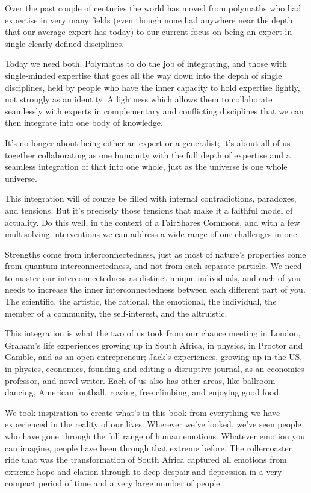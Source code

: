Over the past couple of centuries the world has moved from polymaths who had expertise in very many fields (even though none had anywhere near the depth that our average expert has today) to our current focus on being an expert in single clearly defined disciplines.


Today we need both. Polymaths  to do the job of integrating, and those with single-minded expertise that goes all the way down into the depth of single disciplines, held by people who have the inner capacity to hold expertise lightly, not strongly as an identity. A lightness which allows them to collaborate seamlessly with experts in complementary and conflicting disciplines that we can then integrate into one body of knowledge.


It's no longer about being either an expert or a generalist; it's about all of us together collaborating as one humanity with the full depth of expertise and a seamless integration of that into one whole, just as the universe is one whole universe.


This integration will of course be filled with internal contradictions, paradoxes, and tensions. But it's precisely those tensions that make it a faithful model of actuality. Do this well, in the context of a FairShares Commons,  and with a few multisolving interventions\cite{sawin-multisolving} we can address a wide range of our challenges in one.


Strengths come from interconnectedness, just as most of nature’s properties come from quantum interconnectedness, and not from each separate particle. We need to master our interconnectedness as distinct unique individuals, and each of you needs to increase the inner interconnectedness between each different part of you. The scientific, the artistic, the rational, the emotional, the individual, the member of a community, the self-interest, and the altruistic.


This integration is what the two of us took from our chance meeting in London, Graham’s life experiences growing up in South Africa, in physics, in Proctor and Gamble, and as an open entrepreneur; Jack's experiences, growing up in the US, in physics, economics, founding and editing a disruptive journal, as an economics professor, and novel writer. Each of us also has other areas, like ballroom dancing, American football, rowing, free climbing, and enjoying good food.   


We took inspiration to create what's in this book from everything we have experienced in the reality of our lives. Wherever we've looked, we've seen people who have gone through the full range of human emotions. Whatever emotion you can imagine, people have been through that extreme before. The rollercoaster ride that was the transformation of South Africa captured all emotions from extreme hope and elation through to deep despair and depression in a very compact period of time and a very large number of people. 


